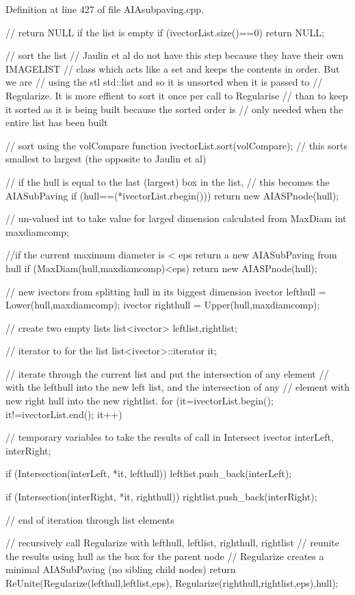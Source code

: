 \-Definition at line 427 of file \-A\-I\-Asubpaving.\-cpp.


\begin{DoxyCode}
{
                    // return NULL if the list is empty
  if (ivectorList.size()==0) return NULL;

  // sort the list
  // Jaulin et al do not have this step because they have their own IMAGELIST
  // class which acts like a set and keeps the contents in order.  But we are
  // using the stl std::list and so it is unsorted when it is passed to
  // Regularize.  It is more effient to sort it once per call to Regularise
  // than to keep it sorted as it is being built because the sorted order is
  // only needed when the entire list has been built

  // sort using the volCompare function
  ivectorList.sort(volCompare);
  // this sorts smallest to largest (the opposite to Jaulin et al)

  // if the hull is equal to the last (largest) box in the list,
  // this becomes the AIASubPaving
  if (hull==(*ivectorList.rbegin())) return new AIASPnode(hull);

  // un-valued int to take value for larged dimension calculated from MaxDiam
  int maxdiamcomp;

  //if the current maximum diameter is < eps return a new AIASubPaving from
       hull
  if (MaxDiam(hull,maxdiamcomp)<eps) return new AIASPnode(hull);

  // new ivectors from splitting hull in its biggest dimension
  ivector lefthull = Lower(hull,maxdiamcomp);
  ivector righthull = Upper(hull,maxdiamcomp);

  // create two empty lists
  list<ivector> leftlist,rightlist;

  // iterator to for the list
  list<ivector>::iterator it;

  // iterate through the current list and put the intersection of any element
  // with the lefthull into the new left list, and the intersection of any
  // element with new right hull into the new rightlist.
  for (it=ivectorList.begin(); it!=ivectorList.end(); it++)
  {
    // temporary variables to take the results of call in Intersect
    ivector interLeft, interRight;

    if (Intersection(interLeft, *it, lefthull))
    {
      leftlist.push_back(interLeft);
    }

    if (Intersection(interRight, *it, righthull))
    {
      rightlist.push_back(interRight);
    }

  }  // end of iteration through list elements

  // recursively call Regularize with lefthull, leftlist, righthull, rightlist
  // reunite the results using hull as the box for the parent node
  // Regularize creates a minimal AIASubPaving (no sibling child nodes)
  return ReUnite(Regularize(lefthull,leftlist,eps),
    Regularize(righthull,rightlist,eps),hull);
}
\end{DoxyCode}
